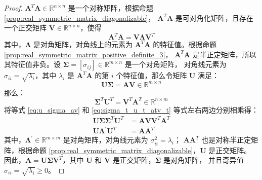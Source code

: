 \begin{proof}
    $\mathbf{A}^T \mathbf{A} \in \mathbb{R}^{n\times n}$ 是一个对称矩阵，根据命题 \ref{prop:real_symmetric_matrix_diagonalizable}，
    $\mathbf{A}^T \mathbf{A}$ 是可对角化矩阵，且存在一个正交矩阵 $\mathbf{V} \in \mathbb{R}^{n \times n}$，使得
    \[
        \mathbf{A}^T \mathbf{A} = \mathbf{V} \boldsymbol{\Lambda} \mathbf{V}^T
    \]
    其中，$\boldsymbol{\Lambda}$ 是对角矩阵，对角线上的元素为 $\mathbf{A}^T \mathbf{A}$ 的特征值。根据命题 \ref{prop:real_symmetric_matrix_positive_definite_3}，
    $\mathbf{A}^T \mathbf{A}$ 是半正定矩阵，所以其特征值非负。设 $\boldsymbol{\Sigma} = [\sigma_{ij}] \in \mathbb{R}^{m \times n}$ 是一个对角矩阵，
    对角线元素为 $\sigma_{ii} = \sqrt{\lambda_i}$，其中 $\lambda_i$ 是 $\mathbf{A}^T \mathbf{A}$ 的第 $i$ 个特征值，那么令矩阵 $\mathbf{U}$ 满足：
    \begin{equation}
        \mathbf{U}\boldsymbol{\Sigma} = \mathbf{A} \mathbf{V} \in \mathbb{R}^{m \times n}
        \label{eq:u_sigma_av}
    \end{equation}
    那么：
    \begin{equation}
        \boldsymbol{\Sigma}^T\mathbf{U}^T = \mathbf{V}^T \mathbf{A}^T \in \mathbb{R}^{n \times m}
        \label{eq:sigma_t_u_t_atv_t}
    \end{equation}
    将等式 \ref{eq:u_sigma_av} 和 \ref{eq:sigma_t_u_t_atv_t} 等式左右两边分别相乘得：
    \begin{align*}
        \mathbf{U}\boldsymbol{\Sigma}\boldsymbol{\Sigma}^T\mathbf{U}^T & = \mathbf{A} \mathbf{V}\mathbf{V}^T \mathbf{A}^T  \\
        \mathbf{U}\boldsymbol{\Lambda}^{\prime}\mathbf{U}^T & = \mathbf{A} \mathbf{A}^T
    \end{align*}
    其中，$\boldsymbol{\Lambda}^{\prime} \in \mathbb{R}^{m\times m}$ 是对角矩阵，对角线元素为 $\sigma_{ii}^2 = \lambda_i$；
    $\mathbf{A} \mathbf{A}^T$ 也是对称半正定矩阵，根据命题 \ref{prop:real_symmetric_matrix_diagonalizable}，$\mathbf{U}$ 是正交矩阵。
    因此，$\mathbf{A} = \mathbf{U} \boldsymbol{\Sigma} \mathbf{V}^T$，其中 $\mathbf{U}$ 和 $\mathbf{V}$ 是正交矩阵，$\boldsymbol{\Sigma}$ 是对角矩阵，
    并且奇异值 $\sigma_{ii} = \sqrt{\lambda_i} \geq 0$。
\end{proof}

